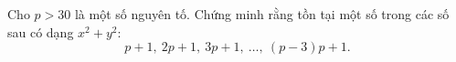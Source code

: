 \ifshowproblem
\begin{problem}\label{example:IRN-2015-MO3-NP5}
	Cho $p > 30$ là một số nguyên tố. Chứng minh rằng tồn tại một số trong các số sau có dạng $x^2 + y^2$:
	\[
		p+1,\ 2p+1,\ 3p+1,\ \ldots,\ (p-3)p+1.
	\]
\end{problem}
\fi

\footnotemark
{}
\fi